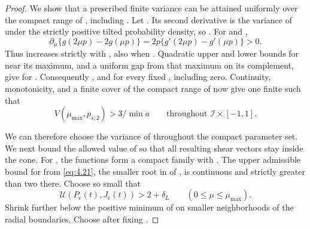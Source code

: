 \begin{proof}
We show that a prescribed finite variance can be attained uniformly over the compact
range of , including . Let
. Its second derivative is the variance of
under the strictly positive tilted probability density, so . For
 and ,
\begin{equation}
 \partial_\mu\{g(2\mu p)-2g(\mu p)\}
 =2p\{g'(2\mu p)-g'(\mu p)\}>0.
\tag{C.6}\label{eq:C.6}
\end{equation}
Thus  increases strictly with , also when
. Quadratic upper and lower bounds
for  near its maximum, and a uniform gap from that maximum on its complement, give
 for . Consequently
, and
 for
every fixed , including zero. Continuity, monotonicity, and a finite cover of the compact
range of  now give one finite  such that
\begin{equation}
 V(\mu_{\max},p_{s,2})>3/\min a
 \qquad\text{throughout }\mathcal I\times[-1,1].
\tag{C.7}\label{eq:C.7}
\end{equation}

We can therefore choose the variance of  throughout the compact parameter set. We
next bound the allowed value of  so that all resulting shear vectors stay inside the cone.
For , the functions
 form a compact family with
. The upper
admissible bound  for  from \eqref{eq:4.21}, the smaller root in
 of
, is
continuous and strictly greater than two there. Choose  so small that
\begin{equation}
 \mathcal U(P_{\mathrm c}(t),J_{\mathrm c}(t))>2+\delta_L
 \qquad(0\leq\mu\leq\mu_{\max}).
\tag{C.8}\label{eq:C.8}
\end{equation}
Shrink  further below the positive minimum of  on smaller neighborhoods of the
radial boundaries. Choose  after fixing .


\end{proof}
